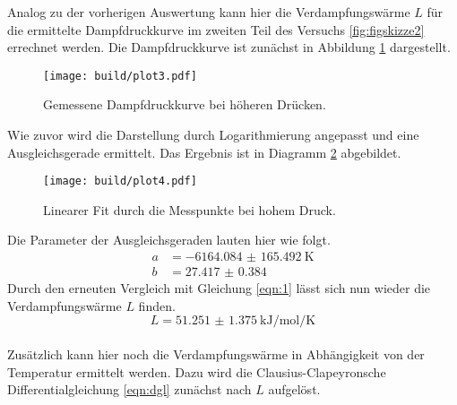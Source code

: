 Analog zu der vorherigen Auswertung kann hier die Verdampfungswärme $L$ für die ermittelte Dampfdruckkurve im zweiten Teil des Versuchs \ref{fig:figskizze2} errechnet werden.
Die Dampfdruckkurve ist zunächst in Abbildung \ref{fig:plot3} dargestellt.
\begin{figure}[h]
    \centering
    \texttt{[image: build/plot3.pdf]}
    \caption{Gemessene Dampfdruckkurve bei höheren Drücken.}
    \label{fig:plot3}
\end{figure}
Wie zuvor wird die Darstellung durch Logarithmierung angepasst und eine Ausgleichsgerade ermittelt. Das Ergebnis ist in Diagramm \ref{fig:plot4} abgebildet.
\begin{figure}[h]
    \centering
    \texttt{[image: build/plot4.pdf]}
    \caption{Linearer Fit durch die Messpunkte bei hohem Druck.}
    \label{fig:plot4}
\end{figure}
Die Parameter der Ausgleichsgeraden lauten hier wie folgt.
\begin{align}
    a &= \SI{-6164.084(165492)}{\kelvin} \\
    b &= \SI{27.417(0384)}{}
\end{align}
Durch den erneuten Vergleich mit Gleichung \eqref{eqn:1} lässt sich nun wieder die Verdampfungswärme $L$ finden.
\begin{equation}
L = \SI{51.251(1375)}{\kilo\joule\per\mol\per\kelvin}
\end{equation}
\\
Zusätzlich kann hier noch die Verdampfungswärme in Abhängigkeit von der Temperatur ermittelt werden. Dazu wird die Clausius-Clapeyronsche
Differentialgleichung \eqref{eqn:dgl} zunächst nach $L$ aufgelöst.

